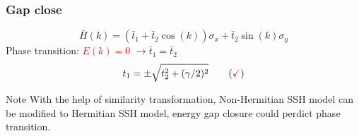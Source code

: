\documentclass{beamer}
\begin{document}
  \begin{frame}
  \frametitle{Gap close}
  \begin{equation}
  \bar{H}(k)=(\bar{t}_1+\bar{t}_2\cos(k))\sigma_x+\bar{t}_2\sin(k)\sigma_y
  \end{equation}
  Phase transition: \textcolor{red}{$E(k)=0$} $\rightarrow \bar{t}_1=\bar{t}_2$
  \begin{equation}
  t_1=\pm\sqrt{t_2^2+(\gamma/2)^2}\qquad(\textcolor{red}{\checkmark})
  \end{equation} 
  \begin{block}{Note}
  With the help of similarity transformation, Non-Hermitian SSH model can be modified to Hermitian SSH model, energy gap closure could perdict phase transition.
  \end{block}
  \end{frame}
\end{document}
